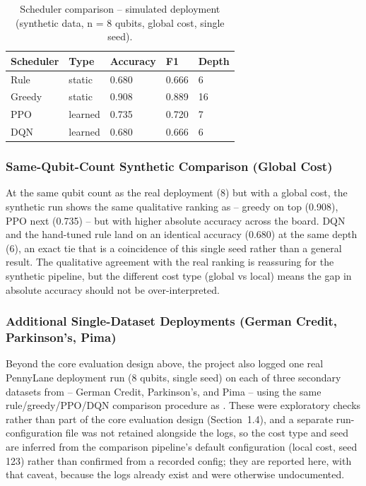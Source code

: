 \begin{table}[htbp]
\centering
\caption{Scheduler comparison -- simulated deployment (synthetic data, n = 8 qubits, global cost, single seed).}
\label{tab:sim8g}
\begin{tabular}{|p{3cm}|p{2cm}|p{2.3cm}|p{2cm}|p{2.5cm}|}
\hline
\textbf{Scheduler} & \textbf{Type} & \textbf{Accuracy} & \textbf{F1} & \textbf{Depth} \\
\hline
Rule & static & 0.680 & 0.666 & 6 \\
Greedy & static & 0.908 & 0.889 & 16 \\
PPO & learned & 0.735 & 0.720 & 7 \\
DQN & learned & 0.680 & 0.666 & 6 \\
\hline
\end{tabular}
\end{table}

\subsubsection{Same-Qubit-Count Synthetic Comparison (Global Cost)}
At the same qubit count as the real deployment (8) but with a global cost, the synthetic run shows the same qualitative ranking as  -- greedy on top (0.908), PPO next (0.735) -- but with higher absolute accuracy across the board. DQN and the hand-tuned rule land on an identical accuracy (0.680) at the same depth (6), an exact tie that is a coincidence of this single seed rather than a general result. The qualitative agreement with the real  ranking is reassuring for the synthetic pipeline, but the different cost type (global vs local) means the gap in absolute accuracy should not be over-interpreted.

\subsubsection{Additional Single-Dataset Deployments (German Credit, Parkinson's, Pima)}
Beyond the core evaluation design above, the project also logged one real PennyLane deployment run (8 qubits, single seed) on each of three secondary datasets from  -- German Credit, Parkinson's, and Pima -- using the same rule/greedy/PPO/DQN comparison procedure as . These were exploratory checks rather than part of the core evaluation design (Section~1.4), and a separate run-configuration file was not retained alongside the logs, so the cost type and seed are inferred from the comparison pipeline's default configuration (local cost, seed 123) rather than confirmed from a recorded config; they are reported here, with that caveat, because the logs already exist and were otherwise undocumented.


